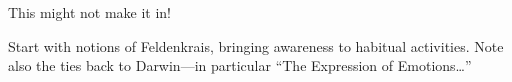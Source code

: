 This might not make it in!

Start with notions of Feldenkrais, bringing awareness to habitual activities.
Note also the ties back to Darwin---in particular “The Expression of Emotions…”
